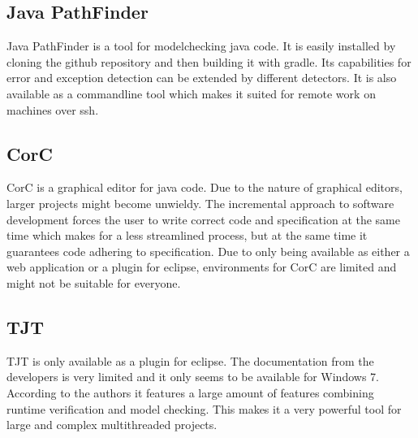\subsection{Java PathFinder}
Java PathFinder is a tool for modelchecking java code. It is easily installed by cloning the github repository and then building it with gradle. Its capabilities for error and exception detection can be extended by different detectors. It is also available as a commandline tool which makes it suited for remote work on machines over ssh. 
\subsection{CorC}
CorC is a graphical editor for java code. Due to the nature of graphical editors, larger projects might become unwieldy. The incremental approach to software development forces the user to write correct code and specification at the same time which makes for a less streamlined process, but at the same time it guarantees code adhering to specification. Due to only being available as either a web application or a plugin for eclipse, environments for CorC are limited and might not be suitable for everyone. 
\subsection{TJT}
TJT is only available as a plugin for eclipse. The documentation from the developers is very limited and it only seems to be available for Windows 7. According to the authors it features a large amount of features combining runtime verification and model checking. This makes it a very powerful tool for large and complex multithreaded projects. 

 